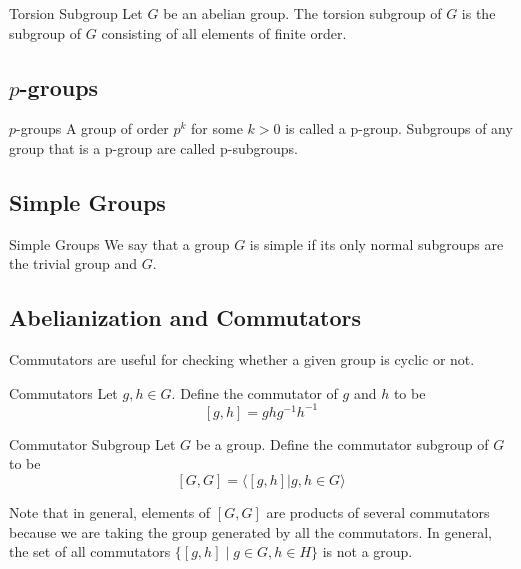 \documentclass[a4paper]{article}
\begin{document}
\begin{defn}{Torsion Subgroup}{} Let $G$ be an abelian group. The torsion subgroup of $G$ is the subgroup of $G$ consisting of all elements of finite order. 
\end{defn}

\subsection{$p$-groups}
\begin{defn}{$p$-groups}{} A group of order $p^k$ for some $k>0$ is called a p-group. Subgroups of any group that is a p-group are called p-subgroups. 
\end{defn}

\subsection{Simple Groups}
\begin{defn}{Simple Groups}{} We say that a group $G$ is simple if its only normal subgroups are the trivial group and $G$. 
\end{defn}

\subsection{Abelianization and Commutators}
Commutators are useful for checking whether a given group is cyclic or not. 

\begin{defn}{Commutators}{} Let $g,h\in G$. Define the commutator of $g$ and $h$ to be $$[g,h]=ghg^{-1}h^{-1}$$
\end{defn}

\begin{defn}{Commutator Subgroup}{} Let $G$ be a group. Define the commutator subgroup of $G$ to be $$[G,G]=\langle [g,h]|g,h\in G\rangle$$
\end{defn}

Note that in general, elements of $[G,G]$ are products of several commutators because we are taking the group generated by all the commutators. In general, the set of all commutators $\{[g,h]\;|\;g\in G, h\in H\}$ is not a group. 
\end{document}
